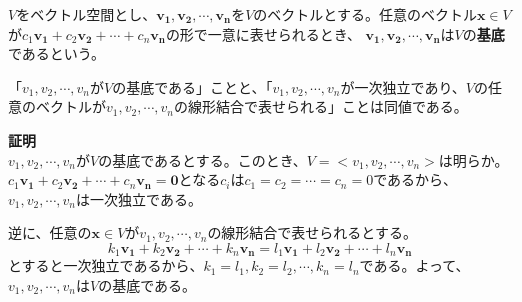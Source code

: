 \documentclass{jlreq}
\begin{document}
\begin{definitionbox}[基底]
  $V$をベクトル空間とし、$\boldsymbol{v_1}, \boldsymbol{v_2}, \cdots, \boldsymbol{v_n}$を$V$のベクトルとする。任意のベクトル$\boldsymbol{x} \in V$が$c_1 \boldsymbol{v_1} + c_2 \boldsymbol{v_2} + \cdots + c_n \boldsymbol{v_n}$の形で一意に表せられるとき、
  $\boldsymbol{v_1}, \boldsymbol{v_2}, \cdots, \boldsymbol{v_n}$は$V$の\textbf{基底}であるという。 \\
\end{definitionbox}

\begin{theorembox}[定理3]
  「$v_1, v_2, \cdots, v_n$が$V$の基底である」ことと、「$v_1, v_2, \cdots, v_n$が一次独立であり、$V$の任意のベクトルが$v_1, v_2, \cdots, v_n$の線形結合で表せられる」ことは同値である。

  \dotfill

  \textbf{証明} \\

  $v_1, v_2, \cdots, v_n$が$V$の基底であるとする。このとき、$V = <v_1, v_2, \cdots, v_n>$は明らか。
  $c_1 \boldsymbol{v_1} + c_2 \boldsymbol{v_2} + \cdots + c_n \boldsymbol{v_n} = \boldsymbol{0}$となる$c_i$は$c_1 = c_2 = \cdots = c_n = 0$であるから、$v_1, v_2, \cdots, v_n$は一次独立である。

  逆に、任意の$\boldsymbol{x} \in V$が$v_1, v_2, \cdots, v_n$の線形結合で表せられるとする。
  \begin{equation*}
    k_1 \boldsymbol{v_1} + k_2 \boldsymbol{v_2} + \cdots + k_n \boldsymbol{v_n} = l_1 \boldsymbol{v_1} + l_2 \boldsymbol{v_2} + \cdots + l_n \boldsymbol{v_n}
  \end{equation*}
  とすると一次独立であるから、$k_1 = l_1, k_2 = l_2, \cdots, k_n = l_n$である。よって、$v_1, v_2, \cdots, v_n$は$V$の基底である。
\end{theorembox}
\end{document}
